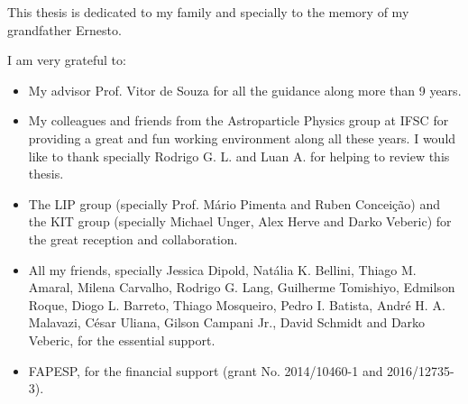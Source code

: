 \begin{agradecimentos}
  This thesis is dedicated to my family and specially to the memory of my grandfather Ernesto.

  I am very grateful to:
  \begin{itemize}
  \item My advisor Prof. Vitor de Souza for all the guidance along more than 9 years.
  \item My colleagues and friends from the Astroparticle Physics group at IFSC for providing a great and fun working environment along all these years. I would like to thank specially Rodrigo G. L. and Luan A. for helping to review this thesis.  
  \item The LIP group (specially Prof. Mário Pimenta and Ruben Conceição) and the KIT group (specially Michael Unger, Alex Herve and Darko Veberic) for the great reception and collaboration. 
  \item All my friends, specially Jessica Dipold, Natália K. Bellini, Thiago M. Amaral, Milena Carvalho, Rodrigo G. Lang, Guilherme Tomishiyo, Edmilson Roque, Diogo L. Barreto, Thiago Mosqueiro, Pedro I. Batista, André H. A. Malavazi, César Uliana, Gilson Campani Jr., David Schmidt and Darko Veberic, for the essential support.   
  \item FAPESP, for the financial support (grant No. 2014/10460-1 and 2016/12735-3).
  \end{itemize}

\end{agradecimentos}

